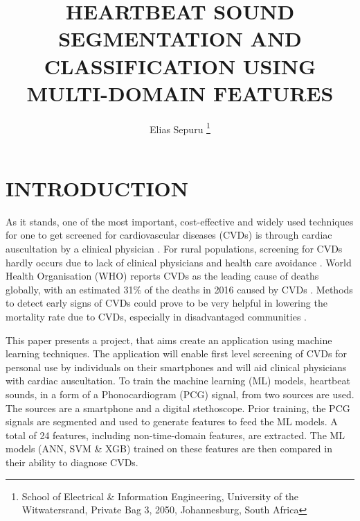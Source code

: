 \documentclass[10pt,twocolumn]{witseiepaper}
\begin{document}

\title{\centering HEARTBEAT SOUND SEGMENTATION AND CLASSIFICATION USING MULTI-DOMAIN FEATURES}

\author{Elias Sepuru
\thanks{School of Electrical \& Information Engineering, University of the
Witwatersrand, Private Bag 3, 2050, Johannesburg, South Africa}
}


%



\maketitle
\thispagestyle{empty}\pagestyle{empty}


%
\section{INTRODUCTION}
\label{intro}
As it stands, one of the most important, cost-effective and widely used techniques for one to get screened for cardiovascular diseases (CVDs) is through cardiac auscultation by a clinical physician \cite{32_montinari2019first}. For rural populations, screening for CVDs hardly occurs due to lack of clinical physicians and health care avoidance \cite{33,34}. World Health Organisation (WHO) reports CVDs as the leading cause of deaths globally, with an estimated 31\% of the deaths in 2016 caused by CVDs \cite{WHO}. Methods to detect early signs of CVDs could prove to be very helpful in lowering the mortality rate due to CVDs, especially in disadvantaged communities \cite{34}.

This paper presents a project, that aims create an application using machine learning techniques. The application will enable first level screening of CVDs for personal use by individuals on their smartphones and will aid clinical physicians with cardiac auscultation. To train the machine learning (ML) models, heartbeat sounds, in a form of a Phonocardiogram (PCG) signal, from two sources are used. The sources are a smartphone and a digital stethoscope. Prior training, the PCG signals are segmented and used to generate features to feed the ML models. A total of 24 features, including non-time-domain features, are extracted. The ML models (ANN, SVM \& XGB) trained on these features are then compared in their ability to diagnose CVDs.
\end{document}
